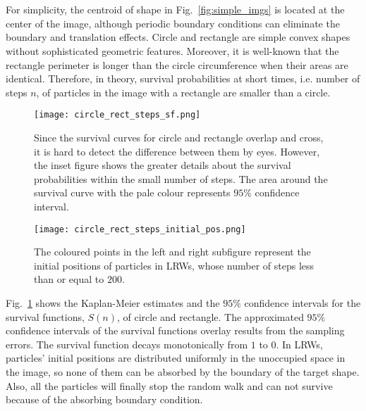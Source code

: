 


\section{}


For simplicity, the centroid of shape in Fig.~\ref{fig:simple_imgs} is
located at the center of the image, although periodic boundary
conditions can eliminate the boundary and translation effects. Circle
and rectangle are simple convex shapes without sophisticated geometric
features. Moreover, it is well-known that the rectangle perimeter is
longer than the circle circumference when their areas are
identical. Therefore, in theory, survival probabilities at short
times, i.e. number of steps $n$, of particles in the image with a
rectangle are smaller than a circle.


    \begin{figure}
      \centering
      \texttt{[image: circle\_rect\_steps\_sf.png]}
      \caption{Since the survival curves for circle and rectangle overlap and cross, it is hard to detect the difference between them by eyes. However, the inset figure shows the greater details about the survival probabilities within the small number of steps. The area around the survival curve with the pale colour represents $95\%$ confidence interval.}
      \label{fig:sf_simple_shape_steps}
    \end{figure}


   \begin{figure}
      \centering
      \texttt{[image: circle\_rect\_steps\_initial\_pos.png]}
      \caption{The coloured points in the left and right subfigure represent the initial positions of particles in LRWs, whose number of steps less than or equal to $200$.}
      \label{fig:cir_rect_steps_initial_pos}
    \end{figure}


Fig.~\ref{fig:sf_simple_shape_steps} shows the Kaplan-Meier estimates
and the $95\%$ confidence intervals for the survival functions,
$S(n)$, of circle and rectangle. The approximated $95\%$ confidence
intervals of the survival functions overlay results from the sampling
errors. The survival function decays monotonically from $1$ to $0$. In
LRWs, particles' initial positions are distributed uniformly in the
unoccupied space in the image, so none of them can be absorbed by the
boundary of the target shape. Also, all the particles will finally
stop the random walk and can not survive because of the absorbing
boundary condition.


